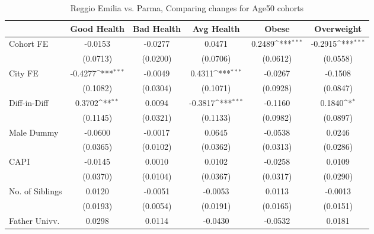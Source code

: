 \begin{table}[htbp]\centering
\def\sym#1{\ifmmode^{#1}\else\(^{#1}\)\fi}
\caption{Reggio Emilia vs. Parma, Comparing changes for Age50 cohorts}
\begin{tabular}{l*{5}{c}}
\toprule
            &\multicolumn{1}{c}{Good Health}&\multicolumn{1}{c}{Bad Health}&\multicolumn{1}{c}{Avg Health}&\multicolumn{1}{c}{Obese}&\multicolumn{1}{c}{Overweight}\\
\midrule
Cohort FE   &     -0.0153         &     -0.0277         &      0.0471         &      0.2489\sym{***}&     -0.2915\sym{***}\\
            &    (0.0713)         &    (0.0200)         &    (0.0706)         &    (0.0612)         &    (0.0558)         \\
\addlinespace
City FE     &     -0.4277\sym{***}&     -0.0049         &      0.4311\sym{***}&     -0.0267         &     -0.1508         \\
            &    (0.1082)         &    (0.0304)         &    (0.1071)         &    (0.0928)         &    (0.0847)         \\
\addlinespace
Diff-in-Diff&      0.3702\sym{**} &      0.0094         &     -0.3817\sym{***}&     -0.1160         &      0.1840\sym{*}  \\
            &    (0.1145)         &    (0.0321)         &    (0.1133)         &    (0.0982)         &    (0.0897)         \\
\addlinespace
Male Dummy  &     -0.0600         &     -0.0017         &      0.0645         &     -0.0538         &      0.0246         \\
            &    (0.0365)         &    (0.0102)         &    (0.0362)         &    (0.0313)         &    (0.0286)         \\
\addlinespace
CAPI        &     -0.0145         &      0.0010         &      0.0102         &     -0.0258         &      0.0109         \\
            &    (0.0370)         &    (0.0104)         &    (0.0367)         &    (0.0317)         &    (0.0290)         \\
\addlinespace
No. of Siblings&      0.0120         &     -0.0051         &     -0.0053         &      0.0113         &     -0.0013         \\
            &    (0.0193)         &    (0.0054)         &    (0.0191)         &    (0.0165)         &    (0.0151)         \\
\addlinespace
Father Univv.&      0.0298         &      0.0114         &     -0.0430         &     -0.0532         &      0.0181         \\

\end{tabular}
\end{table}
